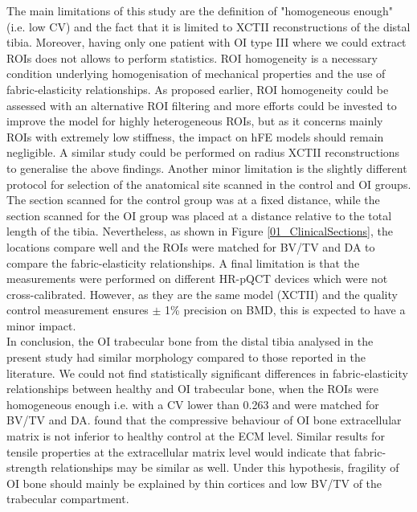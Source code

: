 \documentclass[a4paper,fleqn]{DC_ArtStyle}
\begin{document}
	The main limitations of this study are the definition of "homogeneous enough" (i.e. low CV) and the fact that it is limited to  XCTII reconstructions of the distal tibia. Moreover, having only one patient with OI type III where we could extract ROIs does not allows to perform statistics. %
	ROI homogeneity is a necessary condition underlying homogenisation of mechanical properties and the use of fabric-elasticity relationships. %
	As proposed earlier, ROI homogeneity could be assessed with an alternative ROI filtering and more efforts could be invested to improve the model for highly heterogeneous ROIs, but as it concerns mainly ROIs with extremely low stiffness, the impact on hFE models should remain negligible.
	A similar study could be performed on radius XCTII reconstructions to generalise the above findings. Another minor limitation is the slightly different protocol for selection of the anatomical site scanned in the control and OI groups. The section scanned for the control group was at a fixed distance, while the section scanned for the OI group was placed at a distance relative to the total length of the tibia. Nevertheless, as shown in Figure \ref{01_ClinicalSections}, the locations compare well and the ROIs were matched for BV/TV and DA to compare the fabric-elasticity relationships. A final limitation is that the measurements were performed on different HR-pQCT devices which were not cross-calibrated. However, as they are the same model (XCTII) and the quality control measurement ensures $\pm$ 1\% precision on BMD, this is expected to have a minor impact. \\
	
	In conclusion, the OI trabecular bone from the distal tibia analysed in the present study had similar morphology compared to those reported in the literature. We could not find statistically significant differences in fabric-elasticity relationships between healthy and OI trabecular bone, when the ROIs were homogeneous enough i.e. with a CV lower than 0.263 and were matched for BV/TV and DA.
	\citeauthor{Indermaur2021} \cite{Indermaur2021} found that the compressive behaviour of OI bone extracellular matrix is not inferior to healthy control at the ECM level. Similar results for tensile properties at the extracellular matrix level would indicate that fabric-strength relationships may be similar as well. Under this hypothesis, fragility of OI bone should mainly be explained by thin cortices and low BV/TV of the trabecular compartment.
	
\end{document}
